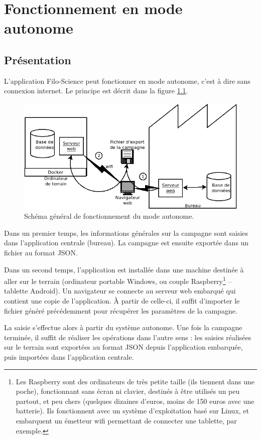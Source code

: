 \chapter{Fonctionnement en mode autonome}

\section{Présentation}

L'application Filo-Science peut fonctionner en mode autonome, c'est à dire sans connexion internet. Le principe est décrit dans la figure \ref{fig:docker}.

\begin{figure}[h]
\centering
\includegraphics[width=0.8\linewidth]{images/docker_schema_general}
\caption{Schéma général de fonctionnement du mode autonome.}
\label{fig:docker}
\end{figure}

Dans un premier temps, les informations générales sur la campagne sont saisies dans l'application centrale (bureau). La campagne est ensuite exportée dans un fichier au format JSON.

Dans un second temps, l'application est installée dans une machine destinée à aller sur le terrain (ordinateur portable Windows, ou couple Raspberry\footnote{Les Raspberry sont des ordinateurs de très petite taille (ils tiennent dans une poche), fonctionnant sans écran ni clavier, destinés à être utilisés un peu partout, et peu chers (quelques dizaines d'euros, moins de 150 euros avec une batterie). Ils fonctionnent avec un système d'exploitation basé sur Linux, et embarquent un émetteur wifi permettant de connecter une tablette, par exemple.} -- tablette Android). 
Un navigateur se connecte au serveur web embarqué qui contient une copie de l'application. À partir de celle-ci, il suffit d'importer le fichier généré précédemment pour récupérer les paramètres de la campagne.

La saisie s'effectue alors à partir du système autonome. Une fois la campagne terminée, il suffit de réaliser les opérations dans l'autre sens :  les saisies réalisées sur le terrain sont exportées au format JSON depuis l'application embarquée, puis importées dans l'application centrale.

